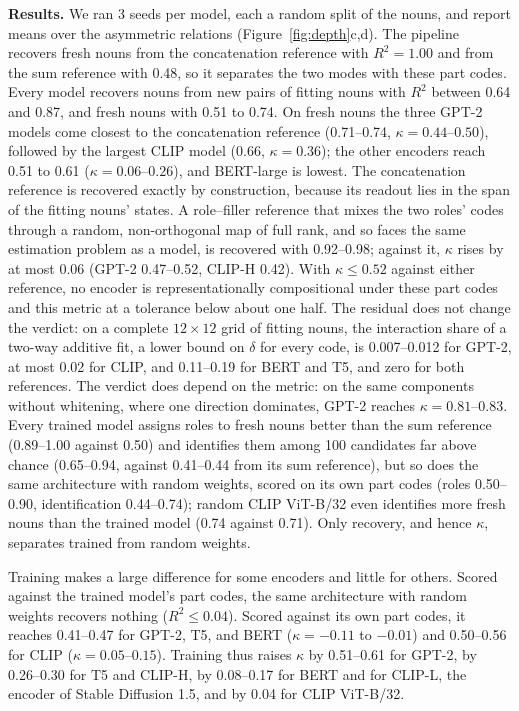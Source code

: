 \documentclass[10pt]{article}
\theoremstyle{plain}
\theoremstyle{remark}
\begin{document}
\textbf{Results.} We ran 3 seeds per model, each a random split of the nouns, and report means over the asymmetric relations (Figure~\ref{fig:depth}c,d). The pipeline recovers fresh nouns from the concatenation reference with $R^2 = 1.00$ and from the sum reference with 0.48, so it separates the two modes with these part codes. Every model recovers nouns from new pairs of fitting nouns with $R^2$ between 0.64 and 0.87, and fresh nouns with 0.51 to 0.74. On fresh nouns the three GPT-2 models come closest to the concatenation reference (0.71--0.74, $\kappa = 0.44$--$0.50$), followed by the largest CLIP model (0.66, $\kappa = 0.36$); the other encoders reach 0.51 to 0.61 ($\kappa = 0.06$--$0.26$), and BERT-large is lowest. The concatenation reference is recovered exactly by construction, because its readout lies in the span of the fitting nouns' states. A role--filler reference that mixes the two roles' codes through a random, non-orthogonal map of full rank, and so faces the same estimation problem as a model, is recovered with 0.92--0.98; against it, $\kappa$ rises by at most 0.06 (GPT-2 0.47--0.52, CLIP-H 0.42). With $\kappa \le 0.52$ against either reference, no encoder is representationally compositional under these part codes and this metric at a tolerance below about one half. The residual does not change the verdict: on a complete $12 \times 12$ grid of fitting nouns, the interaction share of a two-way additive fit, a lower bound on $\delta$ for every code, is 0.007--0.012 for GPT-2, at most 0.02 for CLIP, and 0.11--0.19 for BERT and T5, and zero for both references. The verdict does depend on the metric: on the same components without whitening, where one direction dominates, GPT-2 reaches $\kappa = 0.81$--$0.83$. Every trained model assigns roles to fresh nouns better than the sum reference (0.89--1.00 against 0.50) and identifies them among 100 candidates far above chance (0.65--0.94, against 0.41--0.44 from its sum reference), but so does the same architecture with random weights, scored on its own part codes (roles 0.50--0.90, identification 0.44--0.74); random CLIP ViT-B/32 even identifies more fresh nouns than the trained model (0.74 against 0.71). Only recovery, and hence $\kappa$, separates trained from random weights.

Training makes a large difference for some encoders and little for others. Scored against the trained model's part codes, the same architecture with random weights recovers nothing ($R^2 \le 0.04$). Scored against its own part codes, it reaches 0.41--0.47 for GPT-2, T5, and BERT ($\kappa = -0.11$ to $-0.01$) and 0.50--0.56 for CLIP ($\kappa = 0.05$--$0.15$). Training thus raises $\kappa$ by 0.51--0.61 for GPT-2, by 0.26--0.30 for T5 and CLIP-H, by 0.08--0.17 for BERT and for CLIP-L, the encoder of Stable Diffusion 1.5, and by 0.04 for CLIP ViT-B/32.
\end{document}
